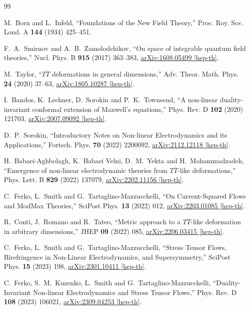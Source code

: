 \documentclass[a4paper,11pt]{article}
\numberwithin{equation}{section}
\begin{document}
\begin{thebibliography}{99}

M.~Born and L.~Infeld,
``Foundations of the New Field Theory,''
Proc. Roy. Soc. Lond. A \textbf{144} (1934) 425--451.

F.~A.~Smirnov and A.~B.~Zamolodchikov,
``On space of integrable quantum field theories,''
Nucl. Phys. B \textbf{915} (2017) 363--383,
\href{https://arxiv.org/abs/1608.05499}{arXiv:1608.05499 [hep-th]}.

M.~Taylor,
``$T\overline T$ deformations in general dimensions,''
Adv. Theor. Math. Phys. \textbf{24} (2020) 37--63,
\href{https://arxiv.org/abs/1805.10287}{arXiv:1805.10287 [hep-th]}.

I.~Bandos, K.~Lechner, D.~Sorokin and P.~K.~Townsend,
``A non-linear duality-invariant conformal extension of Maxwell's equations,''
Phys. Rev. D \textbf{102} (2020) 121703,
\href{https://arxiv.org/abs/2007.09092}{arXiv:2007.09092 [hep-th]}.

D.~P.~Sorokin,
``Introductory Notes on Non-linear Electrodynamics and its Applications,''
Fortsch. Phys. \textbf{70} (2022) 2200092,
\href{https://arxiv.org/abs/2112.12118}{arXiv:2112.12118 [hep-th]}.

H.~Babaei-Aghbolagh, K.~Babaei Velni, D.~M.~Yekta and H.~Mohammadzadeh,
``Emergence of non-linear electrodynamic theories from $T\overline T$-like deformations,''
Phys. Lett. B \textbf{829} (2022) 137079,
\href{https://arxiv.org/abs/2202.11156}{arXiv:2202.11156 [hep-th]}.

C.~Ferko, L.~Smith and G.~Tartaglino-Mazzucchelli,
``On Current-Squared Flows and ModMax Theories,''
SciPost Phys. \textbf{13} (2022) 012,
\href{https://arxiv.org/abs/2203.01085}{arXiv:2203.01085 [hep-th]}.

R.~Conti, J.~Romano and R.~Tateo,
``Metric approach to a $T\overline T$-like deformation in arbitrary dimensions,''
JHEP \textbf{09} (2022) 085,
\href{https://arxiv.org/abs/2206.03415}{arXiv:2206.03415 [hep-th]}.

C.~Ferko, L.~Smith and G.~Tartaglino-Mazzucchelli,
``Stress Tensor Flows, Birefringence in Non-Linear Electrodynamics, and Supersymmetry,''
SciPost Phys. \textbf{15} (2023) 198,
\href{https://arxiv.org/abs/2301.10411}{arXiv:2301.10411 [hep-th]}.

C.~Ferko, S.~M.~Kuzenko, L.~Smith and G.~Tartaglino-Mazzucchelli,
``Duality-Invariant Non-linear Electrodynamics and Stress Tensor Flows,''
Phys. Rev. D \textbf{108} (2023) 106021,
\href{https://arxiv.org/abs/2309.04253}{arXiv:2309.04253 [hep-th]}.



\end{thebibliography}
\end{document}
